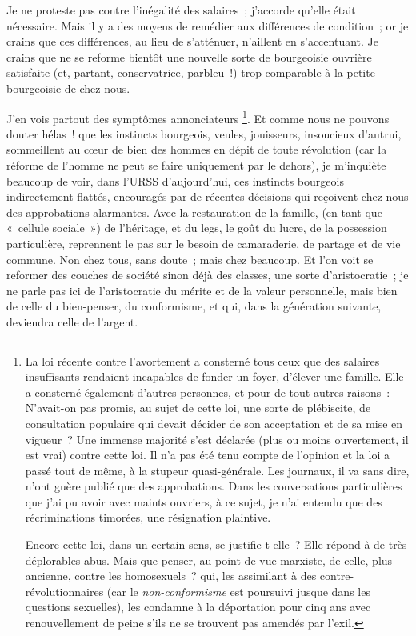 \documentclass[twoside]{book} %
\begin{document}
\noindent Je ne proteste pas contre l’inégalité des salaires ; j’accorde qu’elle était nécessaire. Mais il y a des moyens de remédier aux différences de condition ; or je crains que ces différences, au lieu de s’atténuer, n’aillent en s’accentuant. Je crains que ne se reforme bientôt une nouvelle sorte de bourgeoisie ouvrière satisfaite (et, partant, conservatrice, parbleu !) trop comparable à la petite bourgeoisie de chez nous.\par
J’en vois partout des symptômes annonciateurs \footnote{ \noindent La loi récente contre l’avortement a consterné tous ceux que des salaires insuffisants rendaient incapables de fonder un foyer, d’élever une famille. Elle a consterné également d’autres personnes, et pour de tout autres raisons : N’avait-on pas promis, au sujet de cette loi, une sorte de plébiscite, de consultation populaire qui devait décider de son acceptation et de sa mise en vigueur ? Une immense majorité s’est déclarée (plus ou moins ouvertement, il est vrai) contre cette loi. Il n’a pas été tenu compte de l’opinion et la loi a passé tout de même, à la stupeur quasi-générale. Les journaux, il va sans dire, n’ont guère publié que des approbations. Dans les conversations particulières que j’ai pu avoir avec maints ouvriers, à ce sujet, je n’ai entendu que des récriminations timorées, une résignation plaintive.\par
 Encore cette loi, dans un certain sens, se justifie-t-elle ? Elle répond à de très déplorables abus. Mais que penser, au point de vue marxiste, de celle, plus ancienne, contre les homosexuels ? qui, les assimilant à des contre-révolutionnaires (car le \emph{non-conformisme} est poursuivi jusque dans les questions sexuelles), les condamne à la déportation pour cinq ans avec renouvellement de peine s’ils ne se trouvent pas amendés par l’exil.
}. Et comme nous ne pouvons douter hélas ! que les instincts bourgeois, veules, jouisseurs, insoucieux d’autrui, sommeillent au cœur de bien des hommes en dépit de toute révolution (car la réforme de l’homme ne peut se faire uniquement par le dehors), je m’inquiète beaucoup de voir, dans l’URSS d’aujourd’hui, ces instincts bourgeois indirectement flattés, encouragés par de récentes décisions qui reçoivent chez nous des approbations alarmantes. Avec la restauration de la famille, (en tant que « cellule sociale ») de l’héritage, et du legs, le goût du lucre, de la possession particulière, reprennent le pas sur le besoin de camaraderie, de partage et de vie commune. Non chez tous, sans doute ; mais chez beaucoup. Et l’on voit se reformer des couches de société sinon déjà des classes, une sorte d’aristocratie ; je ne parle pas ici de l’aristocratie du mérite et de la valeur personnelle, mais bien de celle du bien-penser, du conformisme, et qui, dans la génération suivante, deviendra celle de l’argent.\par
\end{document}
